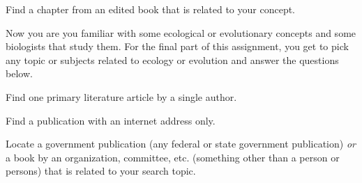 \documentclass[12pt, addpoints, hidelinks]{exam}
\newcommand*\AnswerBox[2]{%
    \parbox[t][#1]{0.92\textwidth}{%
    \begin{solution}#2\end{solution}}
    \vspace*{\stretch{1}}
}
\begin{document}
\begin{questions}
\question[1]
Find a chapter from an edited book that is related to your 
concept.

\AnswerBox{1\baselineskip}{}

Now you are you familiar with some ecological or evolutionary concepts and 
some biologists that study them. For the final part of this
assignment, you get to pick any topic or subjects related to ecology or evolution and
answer the questions below.

\question[1]
Find one primary literature article by a single author.

\AnswerBox{1.5\baselineskip}{}

\question[1]
Find a publication with an internet address only.

\AnswerBox{1\baselineskip}{}

\question[1]
Locate a government publication (any federal or state government
publication) \textit{or} a book by an organization, committee, etc.
(something other than a person or persons) that is related to your
search topic.

\AnswerBox{1\baselineskip}{}

\end{questions}
\end{document}
